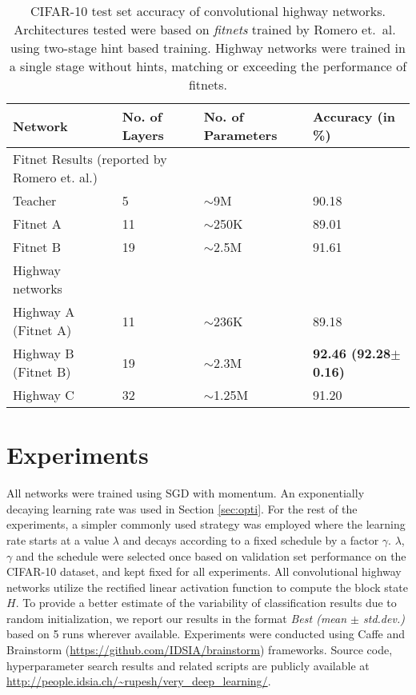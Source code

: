 \documentclass{article}
\begin{document}
\begin{table*}
	\centering
    \begin{tabular}{llll}
    \hline
    \textbf{Network}                                 & \textbf{No. of Layers} & \textbf{No. of Parameters}   & \textbf{Accuracy (in \%)} \\ \hline
    \multicolumn{2}{l}{Fitnet Results (reported by Romero et. al.\cite{Romero2014})} & ~                      & ~        \\
    \quad Teacher                                 & 5                & $\sim$9M    & 90.18  \\
    \quad Fitnet A                                & 11               & $\sim$250K  & 89.01  \\
    \quad Fitnet B                                & 19               & $\sim$2.5M  & 91.61  \\
    \hline
    Highway networks                        & ~                & ~                      & ~        \\
    \quad Highway A (Fitnet A)                    & 11               & $\sim$236K  & 89.18  \\
    \quad Highway B (Fitnet B)                    & 19               & $\sim$2.3M  & \textbf{92.46 (92.28$\pm$0.16)}  \\
    \quad Highway C                               & 32               & $\sim$1.25M & 91.20        \\ \hline
    \end{tabular}
    \caption{CIFAR-10 test set accuracy of convolutional highway networks. Architectures tested were based on
\emph{fitnets} trained by Romero et.~al.~\cite{Romero2014} using two-stage hint based training. Highway networks were trained in a single stage without hints, matching or exceeding the performance of fitnets.}
    \label{tab:fitnets}
\end{table*}


\section{Experiments}
All networks were trained using SGD with momentum. An exponentially decaying learning rate was used in Section \ref{sec:opti}. For the rest of the experiments, a simpler commonly used strategy was employed where the learning rate starts at a value $\lambda$ and decays according to a fixed schedule by a factor $\gamma$. $\lambda$, $\gamma$ and the schedule were selected once based on validation set performance on the CIFAR-10 dataset, and kept fixed for all experiments.
All convolutional highway networks utilize the rectified linear activation function \cite{Glorot2010} to compute the block state $H$. To provide a better estimate of the variability of classification results due to random initialization, we report our results in the format \textit{Best (mean $\pm$ std.dev.)} based on 5 runs wherever available. Experiments were conducted using Caffe \cite{Jia2014} and Brainstorm ({\small \url{https://github.com/IDSIA/brainstorm}}) frameworks. Source code, hyperparameter search results and related scripts are publicly available at {\small \url{http://people.idsia.ch/~rupesh/very_deep_learning/}}.
\end{document}
